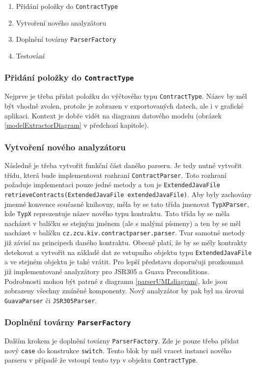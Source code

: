 			\begin{enumerate}
				\item Přidání položky do \texttt{ContractType}
				\item Vytvoření nového analyzátoru
				\item Doplnění továrny \texttt{ParserFactory}
				\item Testování
			\end{enumerate}				    	
	    	
	    	\subsubsection{Přidání položky do \texttt{ContractType}}
	    		Nejprve je třeba přidat položku do výčtového typu \texttt{ContractType}. Název by měl být vhodně zvolen, protože je zobrazen v exportovaných datech, ale i v grafické aplikaci. Kontext je dobře vidět na diagramu datového modelu (obrázek \ref{modelExtractorDiagram} v předchozí kapitole).
	    		
	    	\subsubsection{Vytvoření nového analyzátoru}
	    		Následně je třeba vytvořit funkční část daného parseru. Je tedy nutné vytvořit třídu, která bude implementovat rozhraní \texttt{ContractParser}. Toto rozhraní požaduje implementaci pouze jedné metody a tou je \texttt{ExtendedJavaFile retrieveContracts(ExtendedJavaFile extendedJavaFile)}. Aby byly zachovány jmenné konvence současné knihovny, měla by se tato třída jmenovat \texttt{TypXParser}, kde \texttt{TypX} reprezentuje název nového typu kontraktu. Tato třída by se měla nacházet v balíčku se stejným jménem (ale s malými písmeny) a ten by se měl nacházet v balíčku \texttt{cz.zcu.kiv.contractparser.parser}. Tvar samotné metody již závisí na principech daného kontraktu. Obecně platí, že by se měly kontrakty detekovat a vytvořit na základě dat ze vstupního objektu typu \texttt{ExtendedJavaFile} a ve stejném objektu je také vrátit. Pro lepší představu doporučuji prozkoumat již implementované analyzátory pro JSR305 a Guava Preconditions.\\
	    		
	    		Podrobnosti mohou být patrné z diagramu \ref{parserUMLdiagram}, kde jsou zobrazeny všechny zmíněné komponenty. Nový analyzátor by pak byl na úrovni \texttt{GuavaParser} či \texttt{JSR305Parser}.
	    		
	    	\subsubsection{Doplnění továrny \texttt{ParserFactory}} 
	    		Dalším krokem je doplnění továrny \texttt{ParserFactory}. Zde je pouze třeba přidat nový \texttt{case} do konstrukce \texttt{switch}. Tento blok by měl vracet instanci nového parseru v případě že vstoupí tento typ v objektu \texttt{ContractType}.
	    			
